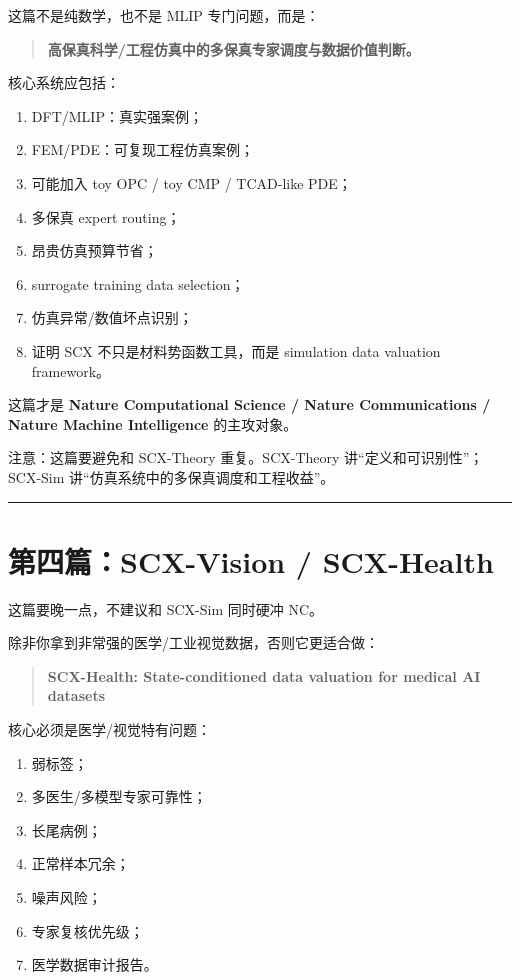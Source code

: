 \documentclass[
  12pt,
]{ctexart}
\providecommand{\tightlist}{%
  \setlength{\itemsep}{0pt}\setlength{\parskip}{0pt}}
\begin{document}
这篇不是纯数学，也不是 MLIP 专门问题，而是：

\begin{quote}
\textbf{高保真科学/工程仿真中的多保真专家调度与数据价值判断。}
\end{quote}

核心系统应包括：

\begin{enumerate}
\def\labelenumi{\arabic{enumi}.}
\tightlist
\item
  DFT/MLIP：真实强案例；
\item
  FEM/PDE：可复现工程仿真案例；
\item
  可能加入 toy OPC / toy CMP / TCAD-like PDE；
\item
  多保真 expert routing；
\item
  昂贵仿真预算节省；
\item
  surrogate training data selection；
\item
  仿真异常/数值坏点识别；
\item
  证明 SCX 不只是材料势函数工具，而是 simulation data valuation
  framework。
\end{enumerate}

这篇才是 \textbf{Nature Computational Science / Nature Communications /
Nature Machine Intelligence} 的主攻对象。

注意：这篇要避免和 SCX-Theory 重复。SCX-Theory
讲``定义和可识别性''；SCX-Sim 讲``仿真系统中的多保真调度和工程收益''。

\begin{center}\rule{0.5\linewidth}{0.5pt}\end{center}

\section{\texorpdfstring{\textbf{第四篇：SCX-Vision /
SCX-Health}}{第四篇：SCX-Vision / SCX-Health}}\label{ux7b2cux56dbux7bc7scx-vision-scx-health}

这篇要晚一点，不建议和 SCX-Sim 同时硬冲 NC。

除非你拿到非常强的医学/工业视觉数据，否则它更适合做：

\begin{quote}
\textbf{SCX-Health: State-conditioned data valuation for medical AI
datasets}
\end{quote}

核心必须是医学/视觉特有问题：

\begin{enumerate}
\def\labelenumi{\arabic{enumi}.}
\tightlist
\item
  弱标签；
\item
  多医生/多模型专家可靠性；
\item
  长尾病例；
\item
  正常样本冗余；
\item
  噪声风险；
\item
  专家复核优先级；
\item
  医学数据审计报告。
\end{enumerate}
\end{document}
